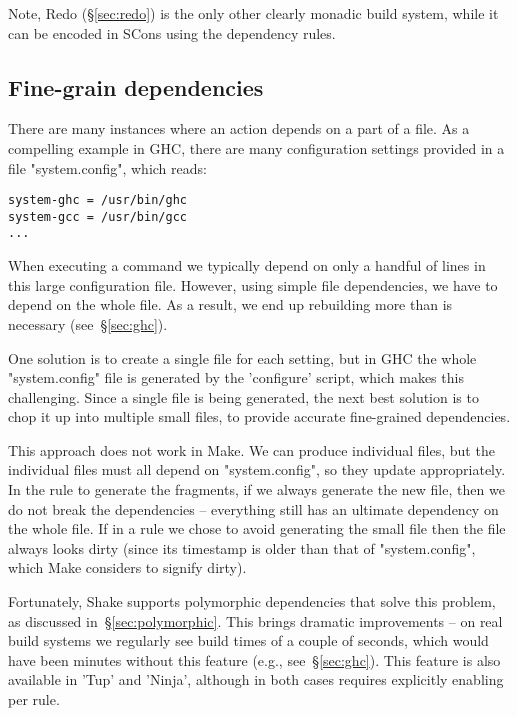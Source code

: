 Note, Redo (\S\ref{sec:redo}) is the only other clearly monadic build
system, while it can be encoded in SCons using the dependency rules.

\subsection{Fine-grain dependencies\label{sec:fine-grain-deps}}

There are many instances where an action depends on a part of a file. As a
compelling example in GHC, there are many configuration settings provided in a
file \lst"system.config", which reads:

\begin{lstlisting}
system-ghc = /usr/bin/ghc
system-gcc = /usr/bin/gcc
...
\end{lstlisting}

\vspace{-2mm}
When executing a command we typically depend on only a handful of lines in this
large configuration file. However, using simple file dependencies, we have to
depend on the whole file. As a result, we end up rebuilding more than is
necessary (see~\S\ref{sec:ghc}).

One solution is to create a single file for each setting, but in GHC the whole
\lst"system.config" file is generated by the \lst'configure' script, which makes
this challenging. Since a single file is being generated, the next best solution
is to chop it up into multiple small files, to provide accurate fine-grained
dependencies.

This approach does not work in Make. We can produce individual
files, but the individual files must all depend on \lst"system.config", so they
update appropriately. In the rule to generate the fragments, if we always generate the
new file, then we do not break the dependencies -- everything still has an
ultimate dependency on the whole file. If in a rule we chose to avoid generating
the small file then the file always looks dirty (since its timestamp is older
than that of \lst"system.config", which Make considers to signify dirty).

Fortunately, Shake supports polymorphic dependencies that solve this problem,
as discussed in~\S\ref{sec:polymorphic}. This brings dramatic improvements -- on
real build systems we regularly see build times of a couple of seconds, which
would have been minutes without this feature (e.g., see~\S\ref{sec:ghc}). This
feature is also available in \lst'Tup' and \lst'Ninja', although in both cases
requires explicitly enabling per rule.

